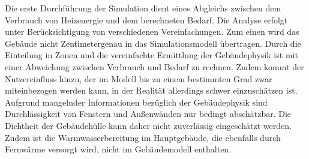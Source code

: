 Die erste Durchführung der Simulation dient eines Abgleichs zwischen dem Verbrauch von Heizenergie und dem berechneten Bedarf. Die Analyse erfolgt unter Berücksichtigung von verschiedenen Vereinfachungen. Zum einen wird das Gebäude nicht Zentimetergenau in das Simulationsmodell übertragen. Durch die Einteilung in Zonen und die vereinfachte Ermittlung der Gebäudephysik ist mit einer Abweichung zwischen Verbrauch und Bedarf zu rechnen. Zudem kommt der Nutzereinfluss hinzu, der im Modell bis zu einem bestimmten Grad zwar miteinbezogen werden kann, in der Realität allerdings schwer einzuschätzen ist. 
Aufgrund mangelnder Informationen bezüglich der Gebäudephysik sind Durchlässigkeit von Fenstern und Außenwänden nur bedingt abschätzbar. Die Dichtheit der Gebäudehülle kann daher nicht zuverlässig eingeschätzt werden.\\
Zudem ist die Warmwasserbereitung im Hauptgebäude, die ebenfalls durch Fernwärme versorgt wird, nicht im Gebäudemodell enthalten. \\